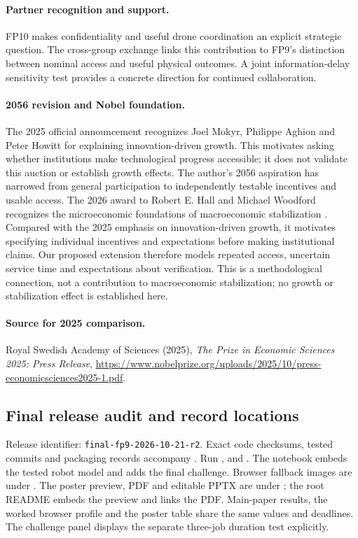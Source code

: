 \paragraph{Partner recognition and support.} FP10 makes confidentiality and useful drone coordination an explicit strategic question. The cross-group exchange links this contribution to FP9's distinction between nominal access and useful physical outcomes. A joint information-delay sensitivity test provides a concrete direction for continued collaboration.
\paragraph{2056 revision and Nobel foundation.} The 2025 official announcement recognizes Joel Mokyr, Philippe Aghion and Peter Howitt for explaining innovation-driven growth. This motivates asking whether institutions make technological progress accessible; it does not validate this auction or establish growth effects. The author's 2056 aspiration has narrowed from general participation to independently testable incentives and usable access. The 2026 award to Robert E. Hall and Michael Woodford recognizes the microeconomic foundations of macroeconomic stabilization \cite{nobel2026,aea2026}. Compared with the 2025 emphasis on innovation-driven growth, it motivates specifying individual incentives and expectations before making institutional claims. Our proposed extension therefore models repeated access, uncertain service time and expectations about verification. This is a methodological connection, not a contribution to macroeconomic stabilization; no growth or stabilization effect is established here.
\paragraph{Source for 2025 comparison.} Royal Swedish Academy of Sciences (2025), \emph{The Prize in Economic Sciences 2025: Press Release}, \url{https://www.nobelprize.org/uploads/2025/10/press-economicsciences2025-1.pdf}.

\subsection{Final release audit and record locations}
Release identifier: \texttt{final-fp9-2026-10-21-r2}. Exact code checksums, tested commits and packaging records accompany . Run ,  and . The notebook embeds the tested robot model and adds the final challenge. Browser fallback images are under . The poster preview, PDF and editable PPTX are under ; the root README embeds the preview and links the PDF. Main-paper results, the worked browser profile and the poster table share the same values and deadlines. The challenge panel displays the separate three-job duration test explicitly.

